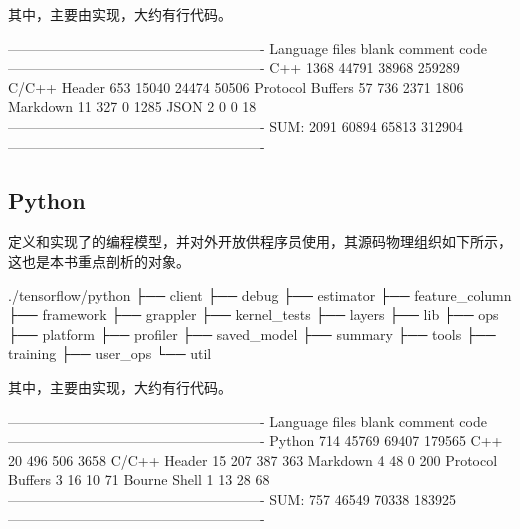 \begin{content}
其中，主要由实现，大约有行代码。

\begin{leftbar}
\begin{python}[caption={Core代码统计}]
-------------------------------------------------------
Language             files    blank   comment      code
-------------------------------------------------------
C++                   1368    44791     38968    259289
C/C++ Header           653    15040     24474     50506
Protocol Buffers        57      736      2371      1806
Markdown                11      327         0      1285
JSON                     2        0         0        18
-------------------------------------------------------
SUM:                  2091    60894     65813    312904
-------------------------------------------------------
\end{python}
\end{leftbar}

\subsection{Python}

定义和实现了\tf{}的编程模型，并对外开放供程序员使用，其源码物理组织如下所示，这也是本书重点剖析的对象。

\begin{leftbar}
\begin{c++}[caption={Python源码结构}]
./tensorflow/python
├── client
├── debug
├── estimator
├── feature_column
├── framework
├── grappler
├── kernel_tests
├── layers
├── lib
├── ops
├── platform
├── profiler
├── saved_model
├── summary
├── tools
├── training
├── user_ops
└── util
\end{c++}
\end{leftbar}

其中，主要由实现，大约有行代码。

\begin{leftbar}
\begin{python}[caption={Python代码统计}]
-------------------------------------------------------
Language            files     blank   comment      code
-------------------------------------------------------
Python                714     45769     69407    179565
C++                    20       496       506      3658
C/C++ Header           15       207       387       363
Markdown                4        48         0       200
Protocol Buffers        3        16        10        71
Bourne Shell            1        13        28        68
-------------------------------------------------------
SUM:                  757     46549     70338    183925
-------------------------------------------------------
\end{python}
\end{leftbar}


\end{content}

